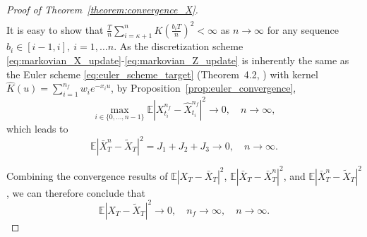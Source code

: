 \documentclass[11pt]{article}%
\theoremstyle{definition}
\begin{document}
\begin{proof}[Proof of Theorem~\ref{theorem:convergence_X}]
\begin{align}
    \end{align}
    It is easy to show that \(\frac{T}{n} \sum_{i=\kappa+1}^{n} K\left(\frac{b_i T}{n}\right)^2 < \infty\) as \(n\to \infty\) for any sequence \(b_i \in [i-1,i],\ i=1,\ldots n\). As the discretization scheme \eqref{eq:markovian_X_update}-\eqref{eq:markovian_Z_update} is inherently the same as the Euler scheme \eqref{eq:euler_scheme_target} (Theorem~4.2, \cite{AlfonsiKeabier2023}) with kernel \(\widehat{K}(u) = \sum_{i=1}^{n_f}w_i e^{-x_i u}\), by Proposition~\ref{prop:euler_convergence}, \[
        \max_{i\in\{0,...,n-1\}} \mathbb{E} |X_{t_i}^{n_f} - \widehat{X}_{t_i}^{n_f}|^2 \to 0,\quad n\to \infty,
    \] 
    which leads to 
    \[
        \mathbb{E}|\bar{X}_T^n - \widetilde{X}_T|^2 = J_1 + J_2 + J_3 \to 0,\quad n\to \infty.
    \]

    Combining the convergence results of \(\mathbb{E} |X_T - \bar{X}_T|^2\), \(\mathbb{E} |\bar{X}_T - \bar{X}_T^n|^2\), and \(\mathbb{E} |\bar{X}_T^n - \widetilde{X}_T|^2\), we can therefore conclude that 
    \[
        \mathbb{E} |X_T - \widetilde{X}_T|^2 \to 0,\quad n_f\to \infty,\quad n\to \infty.
    \]
\end{proof}
\end{document}
